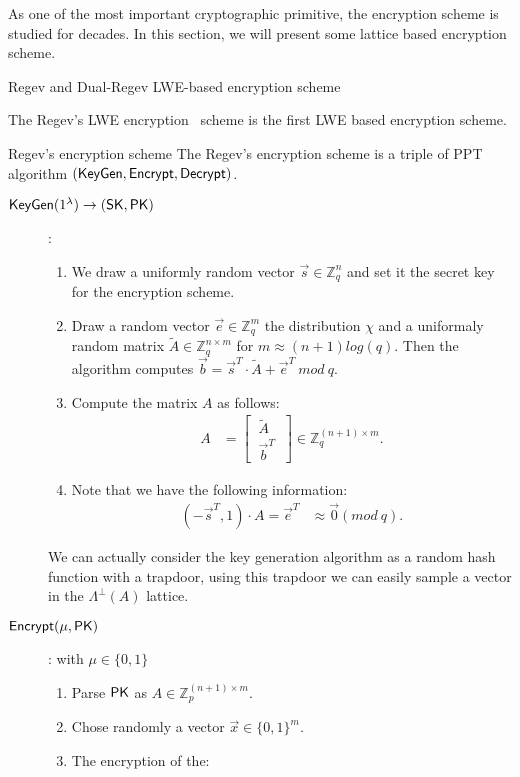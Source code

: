 As one of the most important cryptographic primitive, the encryption scheme is studied for decades. In this section, we will present some lattice based encryption scheme.

\begin{section}{Regev and Dual-Regev LWE-based encryption scheme}
  
The Regev's LWE encryption~\cite{DBLP:conf/stoc/Regev05} scheme is the first LWE based encryption scheme.

\begin{construction}{Regev's encryption scheme}
  The Regev's encryption scheme is a triple of PPT algorithm $({\mathsf{KeyGen}}, {\mathsf{Encrypt}}, {\mathsf{Decrypt}})$.
  \begin{description}
  \item[${\mathsf{KeyGen}}(1^\lambda) \to (\mathsf{SK}, \mathsf{PK})$]: 
    \begin{enumerate}
    \item We draw a uniformly random vector $\vec{s} \in \mathbb{Z}_q^n$ and set it the secret key for the encryption scheme.
    \item Draw a random vector $\vec{e} \in \mathbb{Z}_q^m$ \wrt the distribution $\chi$ and a uniformaly random matrix $\tilde{A} \in \mathbb{Z}_q^{n \times m}$ for $m \approx (n+1) log(q)$. Then the algorithm computes $\vec{b} = \vec{s}^T \cdot \tilde{A} + \vec{e}^T~mod~q$.
    \item Compute the matrix $A$ as follows:
      \begin{align*}
        A &= \left[ \begin{matrix} ~\tilde{A}~ \\ ~\vec{b}^T~ \end{matrix} \right] \in \mathbb{Z}_q^{(n+1) \times m}.
      \end{align*}
    \item Note that we have the following information:
      \begin{align*}
        (-\vec{s}^T, 1) \cdot A = \vec{e}^T &\approx \vec{0} (mod~ q).
      \end{align*}
    \end{enumerate}
    We can actually consider the key generation algorithm as a random hash function with a trapdoor, using this trapdoor we can easily sample a vector in the $\Lambda^{\bot}(A)$ lattice.

    \item[${\mathsf{Encrypt}}(\mu, \mathsf{PK})$]: with $\mu \in \{0, 1\}$
      \begin{enumerate}
      \item Parse $\mathsf{PK}$ as $A \in \mathbb{Z}_p^{(n+1) \times m}$.
      \item Chose randomly a vector $\vec{x} \in \{0,1\}^m$.
      \item The encryption of the:
      \end{enumerate}
  \end{description}


\end{construction}
  

\end{section}